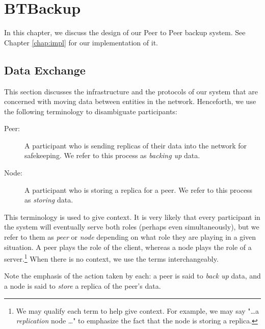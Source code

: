 \documentclass[12pt]{report}
\begin{document}
\chapter{BTBackup} \label{chap:BTBackup}

In this chapter, we discuss the design of our Peer to Peer backup system. See Chapter \ref{chap:impl} for our implementation of it.

\section{Data Exchange} \label{sec:DataExchange}

This section discusses the infrastructure and the protocols of our system that are concerned with moving data between entities in the network. Henceforth, we use the following terminology to disambiguate participants:

\begin{description}
  \item[Peer:] A participant who is sending replicas of their data into the network for safekeeping. We refer to this process as \textit{backing up} data.
  \item[Node:] A participant who is storing a replica for a peer. We refer to this process as \textit{storing} data.
\end{description}

This terminology is used to give context. It is very likely that every participant in the system will eventually serve both roles (perhaps even simultaneously), but we refer to them as \textit{peer} or \textit{node} depending on what role they are playing in a given situation. A peer plays the role of the client, whereas a node plays the role of a server.\footnote{We may qualify each term to help give context. For example, we may say "\ldots a \textit{replication} node \ldots" to emphasize the fact that the node is storing a replica.} When there is no context, we use the terms interchangeably.

Note the emphasis of the action taken by each: a peer is said to \textit{back up} data, and a node is said to \textit{store} a replica of the peer's data.
\end{document}
